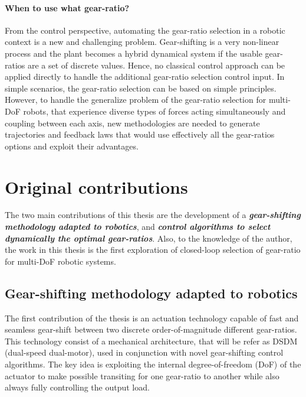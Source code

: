 \paragraph{When to use what gear-ratio?}
From the control perspective, automating the gear-ratio selection in a robotic context is a new and challenging problem. Gear-shifting is a very non-linear process and the plant becomes a hybrid dynamical system if the usable gear-ratios are a set of discrete values. Hence, no classical control approach can be applied directly to handle the additional gear-ratio selection control input. In simple scenarios, the gear-ratio selection can be based on simple principles. However, to handle the generalize problem of the gear-ratio selection for multi-DoF robots, that experience diverse types of forces acting simultaneously and coupling between each axis, new methodologies are needed to generate trajectories and feedback laws that would use effectively all the gear-ratios options and exploit their advantages.



\section{Original contributions}
\label{sec:contribution}

The two main contributions of this thesis are the development of a \emph{\textbf{gear-shifting methodology adapted to robotics}}, and \emph{\textbf{control algorithms to select dynamically the optimal gear-ratios}}. Also, to the knowledge of the author, the work in this thesis is the first exploration of closed-loop selection of gear-ratio for multi-DoF robotic systems. 


\subsection{Gear-shifting methodology adapted to robotics}

The first contribution of the thesis is an actuation technology capable of fast and seamless gear-shift between two discrete order-of-magnitude different gear-ratios. This technology consist of a mechanical architecture, that will be refer as DSDM (dual-speed dual-motor), used in conjunction with novel gear-shifting control algorithms. The key idea is exploiting the internal degree-of-freedom (DoF) of the actuator to make possible transiting for one gear-ratio to another while also always fully controlling the output load. 

